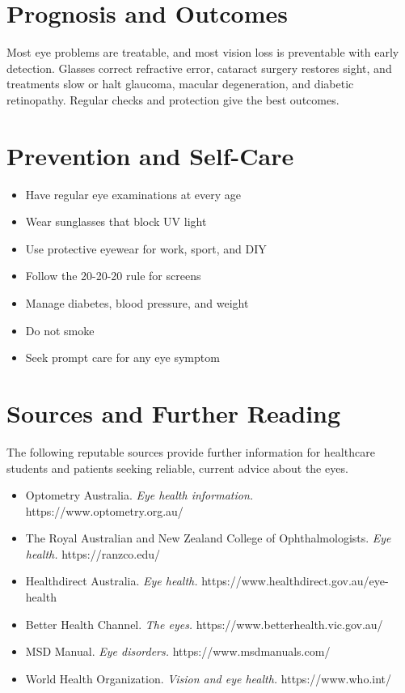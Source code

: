 \section*{Prognosis and Outcomes}
Most eye problems are treatable, and most vision loss is preventable with early detection. Glasses correct refractive error, cataract surgery restores sight, and treatments slow or halt glaucoma, macular degeneration, and diabetic retinopathy. Regular checks and protection give the best outcomes.

\section*{Prevention and Self-Care}
\begin{itemize}
    \item Have regular eye examinations at every age
    \item Wear sunglasses that block UV light
    \item Use protective eyewear for work, sport, and DIY
    \item Follow the 20-20-20 rule for screens
    \item Manage diabetes, blood pressure, and weight
    \item Do not smoke
    \item Seek prompt care for any eye symptom
\end{itemize}

\section*{Sources and Further Reading}
The following reputable sources provide further information for healthcare students and patients seeking reliable, current advice about the eyes.
\begin{itemize}
    \item Optometry Australia. \textit{Eye health information.} https://www.optometry.org.au/
    \item The Royal Australian and New Zealand College of Ophthalmologists. \textit{Eye health.} https://ranzco.edu/
    \item Healthdirect Australia. \textit{Eye health.} https://www.healthdirect.gov.au/eye-health
    \item Better Health Channel. \textit{The eyes.} https://www.betterhealth.vic.gov.au/
    \item MSD Manual. \textit{Eye disorders.} https://www.msdmanuals.com/
    \item World Health Organization. \textit{Vision and eye health.} https://www.who.int/
\end{itemize}
